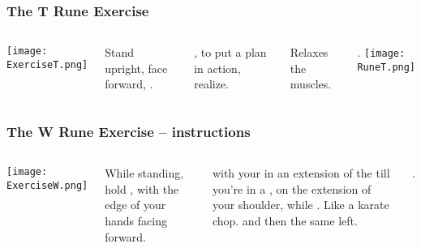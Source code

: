 \begin{frame}
\frametitle{The T Rune Exercise}
\begin{columns}[c] %

\texttt{[image: ExerciseT.png]}

Stand upright, face forward, .

\vspace{5mm}
, to put a plan in action, realize.

\vspace{5mm}
Relaxes the muscles.

.
\texttt{[image: RuneT.png]}
\end{columns}

\end{frame}

\begin{frame}
\frametitle{The W Rune Exercise -- instructions}
\begin{columns}[c] %

\texttt{[image: ExerciseW.png]}

While standing, hold ,  with the edge of your hands facing forward.

 with your  in an extension of the  till you're in a , on the extension of your shoulder, while . Like a \alert{karate chop}.  and then the same left. 

.


\end{columns}

\end{frame}

